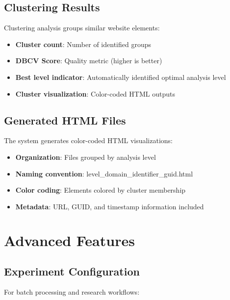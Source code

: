 \subsection{Clustering Results}
\label{subsec:clustering-results}

Clustering analysis groups similar website elements:

\begin{itemize}
    \item \textbf{Cluster count}: Number of identified groups
    \item \textbf{DBCV Score}: Quality metric (higher is better)
    \item \textbf{Best level indicator}: Automatically identified optimal analysis level
    \item \textbf{Cluster visualization}: Color-coded HTML outputs
\end{itemize}

\subsection{Generated HTML Files}
\label{subsec:generated-html}

The system generates color-coded HTML visualizations:

\begin{itemize}
    \item \textbf{Organization}: Files grouped by analysis level
    \item \textbf{Naming convention}: level\_domain\_identifier\_guid.html
    \item \textbf{Color coding}: Elements colored by cluster membership
    \item \textbf{Metadata}: URL, GUID, and timestamp information included
\end{itemize}

\section{Advanced Features}
\label{sec:advanced-features}

\subsection{Experiment Configuration}
\label{subsec:experiment-configuration}

For batch processing and research workflows:

